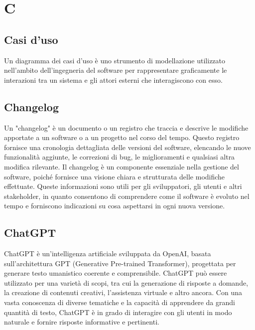\documentclass{article}
\begin{document}
\section{C}

\subsection{Casi d'uso}
Un diagramma dei casi d'uso è uno strumento di modellazione utilizzato nell'ambito dell'ingegneria del software per rappresentare graficamente le interazioni tra un sistema e gli attori esterni che interagiscono con esso.

\subsection{Changelog}
Un "changelog" è un documento o un registro che traccia e descrive le modifiche apportate a un software o a un progetto nel corso del tempo. Questo registro fornisce una cronologia dettagliata delle versioni del software, elencando le nuove funzionalità aggiunte, le correzioni di bug, le miglioramenti e qualsiasi altra modifica rilevante. Il changelog è un componente essenziale nella gestione del software, poiché fornisce una visione chiara e strutturata delle modifiche effettuate. Queste informazioni sono utili per gli sviluppatori, gli utenti e altri stakeholder, in quanto consentono di comprendere come il software è evoluto nel tempo e forniscono indicazioni su cosa aspettarsi in ogni nuova versione.

\subsection{ChatGPT}
ChatGPT è un'intelligenza artificiale sviluppata da OpenAI, basata sull'architettura GPT (Generative Pre-trained Transformer), progettata per generare testo umanistico coerente e comprensibile. ChatGPT può essere utilizzato per una varietà di scopi, tra cui la generazione di risposte a domande, la creazione di contenuti creativi, l'assistenza virtuale e altro ancora. Con una vasta conoscenza di diverse tematiche e la capacità di apprendere da grandi quantità di testo, ChatGPT è in grado di interagire con gli utenti in modo naturale e fornire risposte informative e pertinenti.
\end{document}
